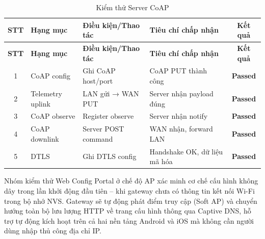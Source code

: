         \begin{longtable}{|c|p{3cm}|p{4cm}|p{5cm}|c|}
            \caption{Kiểm thử Server CoAP}
            \label{tab:test_coap} \\
            \hline
            \textbf{STT} & \textbf{Hạng mục} & \textbf{Điều kiện/Thao tác} & \textbf{Tiêu chí chấp nhận} & \textbf{Kết quả} \\ \hline
            \endfirsthead

            \hline
            \textbf{STT} & \textbf{Hạng mục} & \textbf{Điều kiện/Thao tác} & \textbf{Tiêu chí chấp nhận} & \textbf{Kết quả} \\ \hline
            \endhead

            \hline
            \endfoot
            \endlastfoot

            1 & CoAP config & Ghi CoAP host/port & CoAP PUT thành công & \textcolor{modern_blue}{\textbf{Passed}} \\ \hline
            2 & Telemetry uplink & LAN gửi → WAN PUT & Server nhận payload đúng & \textcolor{modern_blue}{\textbf{Passed}} \\ \hline
            3 & CoAP observe & Register observe & Server nhận notify & \textcolor{modern_blue}{\textbf{Passed}} \\ \hline
            4 & CoAP downlink & Server POST command & WAN nhận, forward LAN & \textcolor{modern_blue}{\textbf{Passed}} \\ \hline
            5 & DTLS & Ghi DTLS config & Handshake OK, dữ liệu mã hóa & \textcolor{modern_blue}{\textbf{Passed}} \\ \hline
        \end{longtable}

        Nhóm kiểm thử Web Config Portal ở chế độ AP xác minh cơ chế cấu hình không dây trong lần khởi động đầu tiên -- khi gateway chưa có thông tin kết nối Wi-Fi trong bộ nhớ NVS. Gateway sẽ tự động phát điểm truy cập (Soft AP) và chuyển hướng toàn bộ lưu lượng HTTP về trang cấu hình thông qua Captive DNS, hỗ trợ tự động kích hoạt trên cả hai nền tảng Android và iOS mà không cần người dùng nhập thủ công địa chỉ IP.

